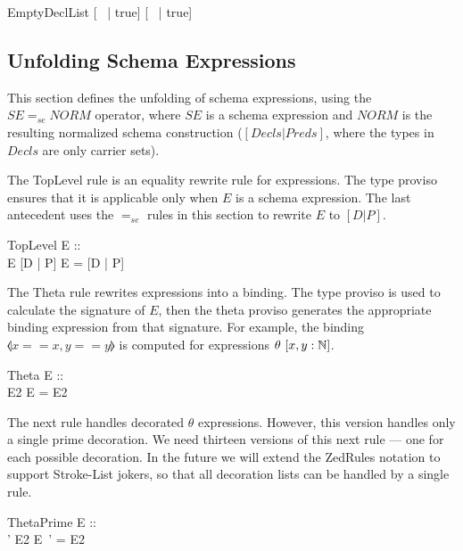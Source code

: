 \documentclass{entcs}
\newcommand{\sexprUnfoldsTo}{\mathrel{=_{se}}}
\newcommand{\declListUnfoldsTo}{\mathrel{=_d}}
\newcommand{\is}{\mathrel{is}}
\begin{document}
\begin{zedrule}{EmptyDeclList}
   [~ | true] \declListUnfoldsTo [~ | true]
\end{zedrule}


\subsection{Unfolding Schema Expressions}

This section defines the unfolding of schema expressions,
using the $SE \sexprUnfoldsTo NORM$ operator, where $SE$
is a schema expression and $NORM$ is the resulting normalized
schema construction ($[Decls|Preds]$, where the types in $Decls$
are only carrier sets).

The TopLevel rule is an equality rewrite rule for expressions.  The
type proviso ensures that it is applicable only when $E$ is a schema
expression.  The last antecedent uses the $\sexprUnfoldsTo$ rules in
this section to rewrite $E$ to $[D | P]$.

\begin{zedrule}{TopLevel}
  \proviso E :: \power [D2 | true] \\
  E  \sexprUnfoldsTo [D | P]
\derives
  E = [D | P]
\end{zedrule}

The Theta rule rewrites expressions into a binding.  The type proviso
is used to calculate the signature of $E$, then the theta proviso
generates the appropriate binding expression from that signature.  For
example, the binding $\lblot x==x,y==y \rblot$ is computed for
expressions $\theta~[x,y:{\mathbb N}]$.
\begin{zedrule}{Theta}
  \proviso E :: \power [D | true] \\
  \proviso \theta [D | true] \is E2
\derives
  \theta E = E2
\end{zedrule}


The next rule handles decorated $\theta$ expressions.  However, this
version handles only a single prime decoration.  We need thirteen
versions of this next rule --- one for each possible decoration.  In
the future we will extend the ZedRules notation to support Stroke-List
jokers, so that all decoration lists can be handled by a single rule.

\begin{zedrule}{ThetaPrime}
  \proviso E :: \power [D | true] \\
  \proviso \theta [D | true] ' \is E2
\derives
  \theta E~' = E2
\end{zedrule}
\end{document}
